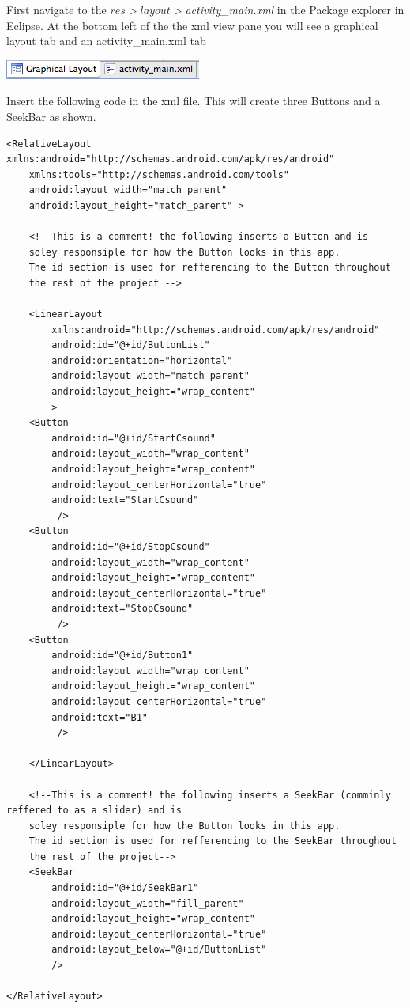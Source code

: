 \documentclass[11pt]{article}
\begin{document}
First navigate to the $res>layout>$\textit{activity_main.xml} in the Package explorer in Eclipse. At the bottom left of the the xml view pane you will see a graphical layout tab and an activity_main.xml tab
\begin{center}
\includegraphics{images/xmlTabBar}
\end{center}

Insert the following code in the xml file. This will create three Buttons and a SeekBar as shown.
\begin{lstlisting}[caption=Code to create UI]
<RelativeLayout xmlns:android="http://schemas.android.com/apk/res/android"
    xmlns:tools="http://schemas.android.com/tools"
    android:layout_width="match_parent"
    android:layout_height="match_parent" >
    
    <!--This is a comment! the following inserts a Button and is 
    soley responsiple for how the Button looks in this app.
    The id section is used for refferencing to the Button throughout
    the rest of the project -->
    
    <LinearLayout 
        xmlns:android="http://schemas.android.com/apk/res/android"
        android:id="@+id/ButtonList"
        android:orientation="horizontal"
        android:layout_width="match_parent"
        android:layout_height="wrap_content"
        >
    <Button
        android:id="@+id/StartCsound"
        android:layout_width="wrap_content"
        android:layout_height="wrap_content"
        android:layout_centerHorizontal="true"
        android:text="StartCsound"
         />
    <Button
        android:id="@+id/StopCsound"
        android:layout_width="wrap_content"
        android:layout_height="wrap_content"
        android:layout_centerHorizontal="true"
        android:text="StopCsound"
         />
    <Button
        android:id="@+id/Button1"
        android:layout_width="wrap_content"
        android:layout_height="wrap_content"
        android:layout_centerHorizontal="true"
        android:text="B1"
         />
    
    </LinearLayout>
    
    <!--This is a comment! the following inserts a SeekBar (comminly reffered to as a slider) and is 
    soley responsiple for how the Button looks in this app.
    The id section is used for refferencing to the SeekBar throughout
    the rest of the project-->
    <SeekBar
        android:id="@+id/SeekBar1" 
        android:layout_width="fill_parent"
        android:layout_height="wrap_content"
        android:layout_centerHorizontal="true"
        android:layout_below="@+id/ButtonList"
        />

</RelativeLayout>
\end{lstlisting}
\end{document}

